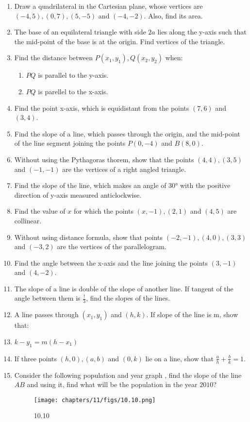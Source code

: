 
\begin{enumerate}
\item Draw a quadrilateral in the Cartesian plane, whose vertices are $(-4,5), (0,7), (5,-5)$ and $(-4,-2)$. Also, find its area.
\item The base of an equilateral triangle with side $2a$ lies along the y-axis such that the mid-point of the base is at the origin. Find vertices of the triangle.
\item Find the distance between $P(x_1,y_1),Q(x_2,y_2)$ when:
\begin{enumerate}[label=(\roman*)]
\item $PQ$ is parallel to the y-axis.
\item $PQ$ is parellel to the x-axis.
\end{enumerate}
\item Find the point x-axis, which is equidistant from the points $(7,6)$ and $(3,4)$.
\item Find the slope of a line, which passes through the origin, and the mid-point of the line segment joining the points $P(0,-4)$ and $B(8,0)$.
\item Without using the Pythagoras thorem, show that the points $(4,4), (3,5)$ and $(-1,-1)$ are the vertices of a right angled triangle.
\item Find the slope of the line, which makes an angle of 30° with the positive  direction of y-axis measured anticlockwise.
\item Find the value of $x$ for which the points $(x,-1), (2,1)$ and $(4,5)$ are collinear.
\item Without using distance formula, show that points $(-2,-1), (4,0), (3,3)$ and $(-3,2)$ are the vertices of the parallelogram.
\item Find the angle between the x-axis and the line joining the points $(3,-1)$ and $(4,-2)$.
\item The slope of a line is double of the slope of another line. If tangent of the angle between them is $\frac{!}{3}$, find the slopes of the lines.
\item A line passes through $(x_1,y_1)$ and $(h,k)$. If slope of the line is m, show that:
\item $k-y_1= m(h-x_1)$
\item If three points $(h,0), (a,b)$ and $(0,k)$ lie on a line, show that $\frac{a}{h}+\frac{b}{k}=1$.
\item Consider the following population and year graph  , find the slope of the line $AB$ and using it, find what will be the population in the year $2010$?
\begin{figure}[ht]
\centering
\texttt{[image: chapters/11/figs/10.10.png]}
\caption{10.10}
\label{fig:10.10}
\end{figure}
\end{enumerate}

